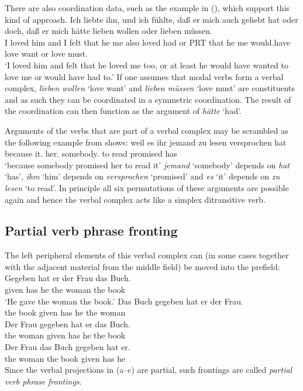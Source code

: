 There are also coordination data, such as the example in (), which support this kind of approach.
\ea
\gll Ich liebte ihn, und ich fühlte, daß er mich auch geliebt hat oder doch, daß er mich hätte lieben wollen oder lieben müssen.\footnotemark\\
     I   loved  him and I felt that he me also loved had or PRT that he me   would.have love want or love must.\\
\glt `I loved him and felt that he loved me too, or at least he would have wanted to love me or would have had to.'
\z
If one assumes that modal verbs form a verbal complex, \emph{lieben wollen} `love want' and
\emph{lieben müssen} `love must' are constituents and as such they can be coordinated in a symmetric
coordination. The result of the coordination can then function as the argument of \emph{hätte}
`had'.

Arguments of the verbs that are part of a verbal complex may be scrambled as the following example
from \citet[]{Haider90b} shows:
\ea\label{ex-weil-es-ihr-jemand-zu-lesen-versprochen-hat}
\gll weil es ihr jemand zu lesen versprochen hat\\
     because it.\acc{} her.\dat{} somebody.\nom{} to read promised has\\
\glt `because somebody promised her to read it'
\z
\emph{jemand} `somebody' depends on \emph{hat} `has', \emph{ihm} `him' depends on \emph{versprochen}
`promised' and \emph{es} `it' depends on \emph{zu lesen} `to read'. In principle all six
permutations of these arguments are possible again and hence the verbal complex acts like a simplex
ditransitive verb.

\subsection{Partial verb phrase fronting}
\label{sec-pvp-phen}

The left peripheral elements of this verbal complex can (in some cases together with the adjacent material
from the middle field) be moved into the prefield:
\eal
\ex
\gll Gegeben hat er der Frau das Buch.\\
     given has he the woman the book\\
\glt `He gave the woman the book.'
\ex
\gll Das Buch gegeben hat er der Frau.\\
     the book given   has he the woman\\
\ex
\gll Der Frau gegeben hat er das Buch.\\
     the woman given  has he the book\\
\ex
\gll Der Frau  das Buch gegeben hat er.\\
     the woman the book given   has he\\
\zl
Since the verbal projections in (a--c) are partial, such frontings are called \emph{partial verb
phrase frontings}.



